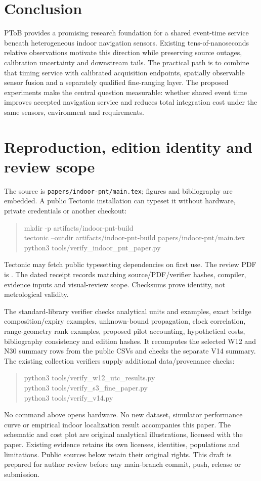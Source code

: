 \documentclass[11pt,letterpaper]{article}
\newcommand{\code}[1]{\texttt{#1}}
\begin{document}
\section{Conclusion}
PToB provides a promising research foundation for a shared event-time service beneath heterogeneous indoor navigation sensors. Existing tens-of-nanoseconds relative observations motivate this direction while preserving source outages, calibration uncertainty and downstream tails. The practical path is to combine that timing service with calibrated acquisition endpoints, spatially observable sensor fusion and a separately qualified fine-ranging layer. The proposed experiments make the central question measurable: whether shared event time improves accepted navigation service and reduces total integration cost under the same sensors, environment and requirements.

\newpage
\appendix
\section{Reproduction, edition identity and review scope}\label{sec:repro}
The source is \code{papers/indoor-pnt/main.tex}; figures and bibliography are embedded. A public Tectonic installation can typeset it without hardware, private credentials or another checkout:
\begin{quote}\small\ttfamily
mkdir -p artifacts/indoor-pnt-build\\
tectonic --outdir artifacts/indoor-pnt-build papers/indoor-pnt/main.tex\\
python3 tools/verify\_indoor\_pnt\_paper.py
\end{quote}
Tectonic may fetch public typesetting dependencies on first use. The review PDF is . The dated receipt  records matching source/PDF/verifier hashes, compiler, evidence inputs and visual-review scope. Checksums prove identity, not metrological validity.

The standard-library verifier checks analytical units and examples, exact bridge composition/expiry examples, unknown-bound propagation, clock correlation, range-geometry rank examples, proposed pilot accounting, hypothetical costs, bibliography consistency and edition hashes. It recomputes the selected W12 and N30 summary rows from the public CSVs and checks the separate V14 summary. The existing collection verifiers supply additional data/provenance checks:
\begin{quote}\small\ttfamily
python3 tools/verify\_w12\_utc\_results.py\\
python3 tools/verify\_s3\_fine\_paper.py\\
python3 tools/verify\_v14.py
\end{quote}
No command above opens hardware. No new dataset, simulator performance curve or empirical indoor localization result accompanies this paper. The schematic and cost plot are original analytical illustrations, licensed with the paper. Existing evidence retains its own licenses, identities, populations and limitations. Public sources below retain their original rights. This draft is prepared for author review before any main-branch commit, push, release or submission.
\end{document}
